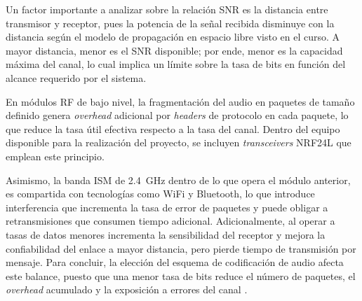 Un factor importante a analizar sobre la relación SNR es la distancia entre transmisor y receptor, pues la potencia de la señal recibida disminuye con la distancia según el modelo de propagación en espacio libre visto en el curso.
A mayor distancia, menor es el SNR disponible; por ende, menor es la capacidad máxima del canal, lo cual implica un límite sobre la tasa de bits en función del alcance requerido por el sistema.

En módulos RF de bajo nivel, la fragmentación del audio en paquetes de tamaño definido genera \textit{overhead} adicional por \textit{headers} de protocolo en cada paquete, lo que reduce la tasa útil efectiva respecto a la tasa del canal.
Dentro del equipo disponible para la realización del proyecto, se incluyen \textit{transceivers} NRF24L que emplean este principio.

Asimismo, la banda ISM de \SI{2.4}{\giga\hertz} dentro de lo que opera el módulo anterior, es compartida con tecnologías como WiFi y Bluetooth, lo que introduce interferencia que incrementa la tasa de error de paquetes y puede obligar a retransmisiones que consumen tiempo adicional.
Adicionalmente, al operar a tasas de datos menores incrementa la sensibilidad del receptor y mejora la confiabilidad del enlace a mayor distancia, pero pierde tiempo de transmisión por mensaje.
Para concluir, la elección del esquema de codificación de audio afecta este balance, puesto que una menor tasa de bits reduce el número de paquetes, el \textit{overhead} acumulado y la exposición a errores del canal \cite{pohlmann2005}.
